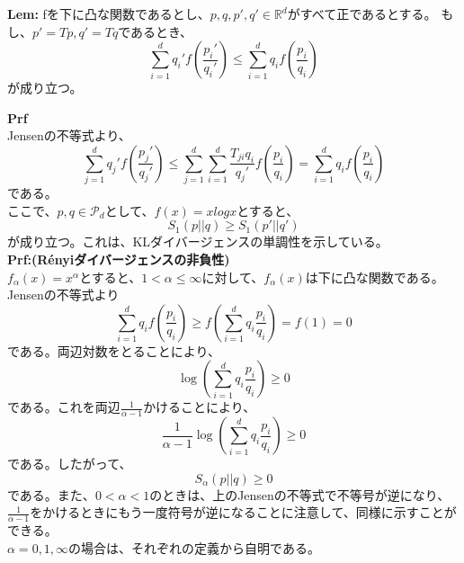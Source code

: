 \documentclass[a4paper,11pt]{jsarticle}
\numberwithin{equation}{section}
\begin{document}
\begin{itembox}[l]{\textbf{Lem:}}
    fを下に凸な関数であるとし、$p,q,p',q' \in \mathbb{R}^d$がすべて正であるとする。
    もし、$p' = Tp, q' = Tq$であるとき、
    \begin{equation}
        \sum_{i=1}^{d} q_i'f\left(\frac{p_i'}{q_i'}\right) \leq \sum_{i=1}^{d} q_i f\left(\frac{p_i}{q_i}\right)
    \end{equation}
    が成り立つ。
\end{itembox}
\textbf{Prf}\\
Jensenの不等式より、
\begin{equation}
    \sum_{j=1}^{d}q_j'f\left(\frac{p_j'}{q_j'}\right) \leq \sum_{j=1}^{d}\sum_{i=1}^{d}\frac{T_{ji}q_i}{q_j'}f\left(\frac{p_i}{q_i}\right)=\sum_{i=1}^{d}q_i f\left(\frac{p_i}{q_i}\right)
\end{equation}
である。\hfill \qedsymbol\\
ここで、$p,q \in \mathcal{P}_d$として、$f(x)=xlogx$とすると、
\begin{equation}
    S_1 (p||q) \geq S_1 (p'||q')
\end{equation}
が成り立つ。これは、KLダイバージェンスの単調性を示している。\\

\textbf{Prf:(Rényiダイバージェンスの非負性)}\\
$f_{\alpha}(x) = x^{\alpha}$とすると、$1<\alpha \leq \infty$に対して、$f_{\alpha}(x)$は下に凸な関数である。\\
Jensenの不等式より
\begin{equation}
    \sum_{i=1}^{d}q_i f(\frac{p_i}{q_i}) \geq f(\sum_{i=1}^{d}q_i \frac{p_i}{q_i}) = f(1) = 0
\end{equation}
である。両辺対数をとることにより、
\begin{equation}
    \log(\sum_{i=1}^{d}q_i \frac{p_i}{q_i}) \geq 0
\end{equation}
である。これを両辺$\frac{1}{\alpha - 1}$かけることにより、
\begin{equation}
    \frac{1}{\alpha - 1}\log(\sum_{i=1}^{d}q_i \frac{p_i}{q_i}) \geq 0
\end{equation}
である。したがって、
\begin{equation}
    S_{\alpha}(p||q) \geq 0
\end{equation}
である。また、$0 < \alpha <1$のときは、上のJensenの不等式で不等号が逆になり、$\frac{1}{\alpha-1}$をかけるときにもう一度符号が逆になることに注意して、同様に示すことができる。\\
$\alpha =0,1,\infty$の場合は、それぞれの定義から自明である。\\  
\hfill \qedsymbol\\
\end{document}
